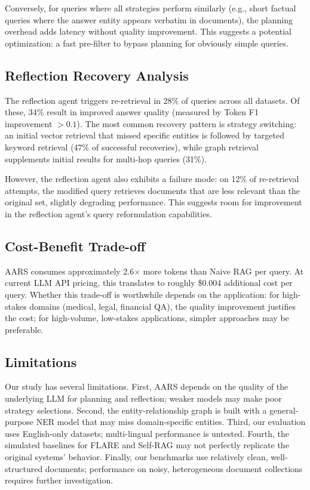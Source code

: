 \documentclass[runningheads]{llncs}
\begin{document}
Conversely, for queries where all strategies perform similarly (e.g., short factual queries where the answer entity appears verbatim in documents), the planning overhead adds latency without quality improvement. This suggests a potential optimization: a fast pre-filter to bypass planning for obviously simple queries.

\subsection{Reflection Recovery Analysis}

The reflection agent triggers re-retrieval in 28\% of queries across all datasets. Of these, 34\% result in improved answer quality (measured by Token F1 improvement $> 0.1$). The most common recovery pattern is strategy switching: an initial vector retrieval that missed specific entities is followed by targeted keyword retrieval (47\% of successful recoveries), while graph retrieval supplements initial results for multi-hop queries (31\%).

However, the reflection agent also exhibits a failure mode: on 12\% of re-retrieval attempts, the modified query retrieves documents that are less relevant than the original set, slightly degrading performance. This suggests room for improvement in the reflection agent's query reformulation capabilities.

\subsection{Cost-Benefit Trade-off}

AARS consumes approximately 2.6$\times$ more tokens than Naive RAG per query. At current LLM API pricing, this translates to roughly \$0.004 additional cost per query. Whether this trade-off is worthwhile depends on the application: for high-stakes domains (medical, legal, financial QA), the quality improvement justifies the cost; for high-volume, low-stakes applications, simpler approaches may be preferable.

\subsection{Limitations}

Our study has several limitations. First, AARS depends on the quality of the underlying LLM for planning and reflection; weaker models may make poor strategy selections. Second, the entity-relationship graph is built with a general-purpose NER model that may miss domain-specific entities. Third, our evaluation uses English-only datasets; multi-lingual performance is untested. Fourth, the simulated baselines for FLARE and Self-RAG may not perfectly replicate the original systems' behavior. Finally, our benchmarks use relatively clean, well-structured documents; performance on noisy, heterogeneous document collections requires further investigation.
\end{document}
